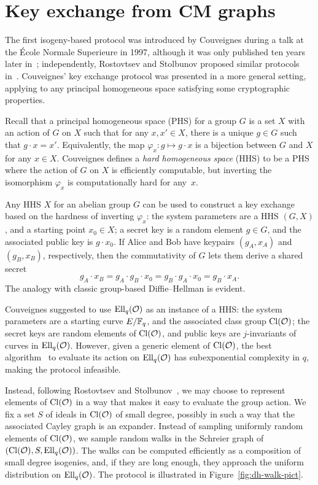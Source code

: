 \documentclass[b5layout]{hdr}
\begin{document}

\section{Key exchange from CM graphs}

The first isogeny-based protocol was introduced by Couveignes during a
talk at the École Normale Superieure in 1997, although it was only
published ten years later in~\cite{cryptoeprint:2006:291};
independently, Rostovtsev and Stolbunov proposed similar protocols
in~\cite{rostovtsev+stolbunov06,Stol}. %
Couveignes' key exchange protocol was presented in a more general
setting, applying to any principal homogeneous space satisfying some
cryptographic properties.

Recall that a principal homogeneous space (PHS) for a group $G$ is a
set $X$ with an action of $G$ on $X$ such that for any $x,x'\in X$,
there is a unique $g\in G$ such that $g\cdot x = x'$. %
Equivalently, the map $φ_x: g\mapsto g\cdot x$ is a bijection between
$G$ and $X$ for any $x\in X$. %
Couveignes defines a \emph{hard homogeneous space} (HHS) to be a PHS
where the action of $G$ on $X$ is efficiently computable, but
inverting the isomorphism $φ_x$ is computationally hard for any~$x$.

Any HHS $X$ for an abelian group $G$ can be used to construct a key
exchange based on the hardness of inverting $\varphi_x$: the system
parameters are a HHS $(G,X)$, and a starting point $x_0∈X$; a secret
key is a random element $g∈G$, and the associated public key is
$g·x_0$. %
If Alice and Bob have keypairs $(g_A,x_A)$ and $(g_B,x_B)$,
respectively, then the commutativity of $G$ lets them derive a shared
secret
\begin{equation*}
  g_A·x_B = g_A·g_B· x_0 = g_B·g_A·x_0 = g_B·x_A.
\end{equation*}
The analogy with classic group-based Diffie--Hellman is evident.

Couveignes suggested to use $\operatorname{Ell}_q(\mathcal{O})$ as an instance of a HHS: the
system parameters are a starting curve $E/\mathbb{F}_q$, and the associated
class group $\operatorname{Cl}(\mathcal{O})$; the secret keys are random elements of
$\operatorname{Cl}(\mathcal{O})$, and public keys are $j$-invariants of curves in
$\operatorname{Ell}_q(\mathcal{O})$. %
However, given a generic element of $\operatorname{Cl}(\mathcal{O})$, the best
algorithm~\cite{jao+soukharev10} to evaluate its action on
$\operatorname{Ell}_q(\mathcal{O})$ has subexponential complexity in $q$, making the protocol
infeasible. %

Instead, following Rostovtsev and
Stolbunov~\cite{rostovtsev+stolbunov06}, we may choose to represent
elements of $\operatorname{Cl}(\mathcal{O})$ in a way that makes it easy to evaluate the
group action. %
We fix a set $S$ of ideals in $\operatorname{Cl}(\mathcal{O})$ of small degree, possibly in
such a way that the associated Cayley graph is an expander. %
Instead of sampling uniformly random elements of $\operatorname{Cl}(\mathcal{O})$, we sample
random walks in the Schreier graph of $(\operatorname{Cl}(\mathcal{O}),S,\operatorname{Ell}_q(\mathcal{O}))$. %
The walks can be computed efficiently as a composition of small degree
isogenies, and, if they are long enough, they approach the uniform
distribution on $\operatorname{Ell}_q(\mathcal{O})$. %
The protocol is illustrated in Figure~\ref{fig:dh-walk-pict}. %
\end{document}
